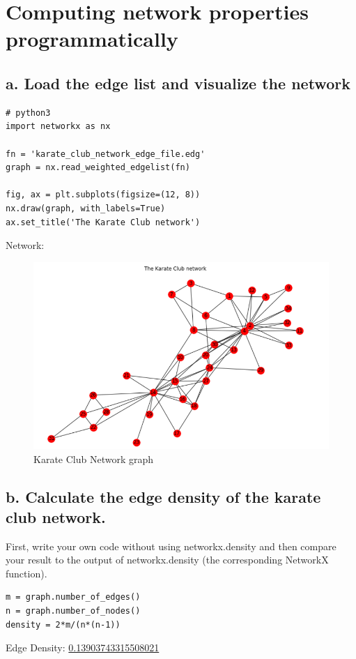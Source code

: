 \documentclass[a4paper,12pt]{article}
\begin{document}
\section{Computing network properties programmatically}

\subsection*{a. Load the edge list and visualize the network}
\begin{lstlisting}
# python3
import networkx as nx

fn = 'karate_club_network_edge_file.edg'
graph = nx.read_weighted_edgelist(fn)

fig, ax = plt.subplots(figsize=(12, 8))
nx.draw(graph, with_labels=True)
ax.set_title('The Karate Club network')
\end{lstlisting}
Network:
\begin{figure}[!ht]
	\begin{center}
    \includegraphics[scale=0.8]{graph_karate.PNG}
    \caption{Karate Club Network graph}
	\label{fig:graph2}
	\end{center}
\end{figure}

\subsection*{b. Calculate the edge density of the karate club network.}
First, write your own code without using networkx.density and then compare your result to the output of networkx.density (the corresponding NetworkX function).
\begin{lstlisting}
m = graph.number_of_edges()
n = graph.number_of_nodes()
density = 2*m/(n*(n-1))
\end{lstlisting}
Edge Density: \underline{0.13903743315508021}
\end{document}
